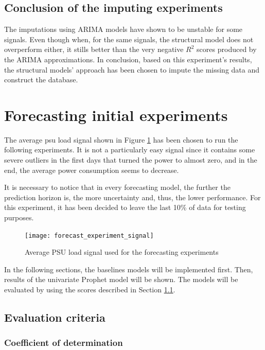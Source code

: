 \subsection{Conclusion of the imputing experiments}

The imputations using ARIMA models have shown to be unstable for some signals. Even though when, for the same signals, the structural model does not overperform either, it stills better than the very negative $R^2$ scores produced by the ARIMA approximations. In conclusion, based on this experiment's results, the structural models' approach has been chosen to impute the missing data and construct the database. 


\section{Forecasting initial experiments}


The average \ac{psu} load signal shown in Figure \ref{fig:forecast_experiment_signal} has been chosen to run the following experiments. It is not a particularly easy signal since it contains some severe outliers in the first days that turned the power to almost zero, and in the end, the average power consumption seems to decrease.

It is necessary to notice that in every forecasting model, the further the prediction horizon is, the more uncertainty and, thus, the lower performance. For this experiment, it has been decided to leave the last 10\% of data for testing purposes.

\begin{figure}[H]
	\centering
	\texttt{[image: forecast\_experiment\_signal]}
	\caption{Average PSU load signal used for the forecasting experiments}
	\label{fig:forecast_experiment_signal}
\end{figure}

In the following sections, the baselines models will be implemented first. Then, results of the univariate Prophet model will be shown. %
The models will be evaluated by using the scores described in Section \ref{subsec:eval_criteria}.

\subsection{Evaluation criteria}\label{subsec:eval_criteria}
\subsubsection*{Coefficient of determination}

